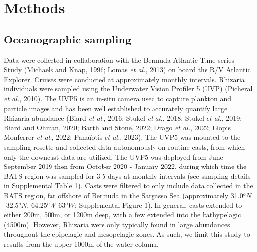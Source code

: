 \documentclass[
]{article}
\begin{document}
\hypertarget{methods}{%
\section{Methods}\label{methods}}

\hypertarget{oceanographic-sampling}{%
\subsection{Oceanographic sampling}\label{oceanographic-sampling}}

Data were collected in collaboration with the Bermuda Atlantic
Time-series Study (Michaels and Knap, 1996; Lomas \emph{et al.}, 2013)
on board the R/V Atlantic Explorer. Cruises were conducted at
approximately monthly intervals. Rhizaria individuals were sampled using
the Underwater Vision Profiler 5 (UVP) (Picheral \emph{et al.}, 2010).
The UVP5 is an in-situ camera used to capture plankton and particle
images and has been well established to accurately quantify large
Rhizaria abundance (Biard \emph{et al.}, 2016; Stukel \emph{et al.},
2018; Stukel \emph{et al.}, 2019; Biard and Ohman, 2020; Barth and
Stone, 2022; Drago \emph{et al.}, 2022; Llopis Monferrer \emph{et al.},
2022; Panaïotis \emph{et al.}, 2023). The UVP5 was mounted to the
sampling rosette and collected data autonomously on routine casts, from
which only the downcast data are utilized. The UVP5 was deployed from
June-September 2019 then from October 2020 - January 2022, during which
time the BATS region was sampled for 3-5 days at monthly intervals (see
sampling details in Supplemental Table 1). Casts were filtered to only
include data collected in the BATS region, far offshore of Bermuda in
the Sargasso Sea (approximately 31.0\(^oN\)-32.5\(^oN\),
64.25\(^oW\)-63\(^oW\); Supplemental Figure 1). In general, casts
extended to either 200m, 500m, or 1200m deep, with a few extended into
the bathypelagic (4500m). However, Rhizaria were only typically found in
large abundances throughout the epipelagic and mesopelagic zones. As
such, we limit this study to results from the upper 1000m of the water
column.
\end{document}
